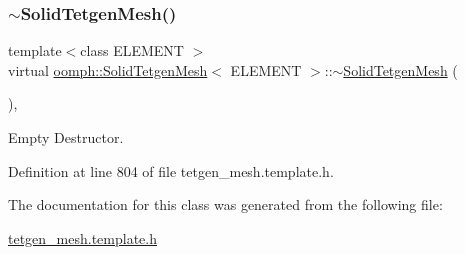 \subsubsection{\texorpdfstring{$\sim$\+Solid\+Tetgen\+Mesh()}{~SolidTetgenMesh()}}
{\footnotesize\ttfamily template$<$class E\+L\+E\+M\+E\+NT $>$ \\
virtual \hyperlink{classoomph_1_1SolidTetgenMesh}{oomph\+::\+Solid\+Tetgen\+Mesh}$<$ E\+L\+E\+M\+E\+NT $>$\+::$\sim$\hyperlink{classoomph_1_1SolidTetgenMesh}{Solid\+Tetgen\+Mesh} (\begin{DoxyParamCaption}{ }\end{DoxyParamCaption})\hspace{0.3cm}{\ttfamily [inline]}, {\ttfamily [virtual]}}



Empty Destructor. 



Definition at line 804 of file tetgen\+\_\+mesh.\+template.\+h.



The documentation for this class was generated from the following file\+:\begin{DoxyCompactItemize}
\item 
\hyperlink{tetgen__mesh_8template_8h}{tetgen\+\_\+mesh.\+template.\+h}\end{DoxyCompactItemize}
